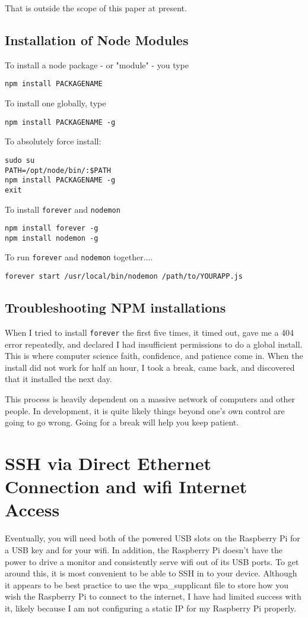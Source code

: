That is outside the scope of this paper at present. 

\subsection{Installation of Node Modules}
To install a node package - or "module" - you type 

\begin{lstlisting}
npm install PACKAGENAME
\end{lstlisting}

To install one globally, type
\begin{lstlisting}
npm install PACKAGENAME -g
\end{lstlisting}


To absolutely force install:
\begin{lstlisting}
sudo su
PATH=/opt/node/bin/:$PATH
npm install PACKAGENAME -g
exit
\end{lstlisting}

To install \texttt{forever} and \texttt{nodemon}
\begin{lstlisting}
npm install forever -g
npm install nodemon -g
\end{lstlisting}

To run \texttt{forever} and \texttt{nodemon} together....
\begin{lstlisting}
forever start /usr/local/bin/nodemon /path/to/YOURAPP.js
\end{lstlisting}

\subsection{Troubleshooting NPM installations}
When I tried to install \texttt{forever} the first five times, it timed out, gave me a 404 error repeatedly, and declared I had insufficient permissions to do a global install. This is where computer science faith, confidence, and patience come in. When the install did not work for half an hour, I took a break, came back, and discovered that it installed the next day.

This process is heavily dependent on a massive network of computers and other people. In development, it is quite likely things beyond one's own control are going to go wrong. Going for a break will help you keep patient.

\section{SSH via Direct Ethernet Connection and wifi Internet Access}
Eventually, you will need both of the powered USB slots on the Raspberry Pi for a USB key and for your wifi. In addition, the Raspberry Pi doesn't have the power to drive a monitor and consistently serve wifi out of its USB ports. To get around this, it is most convenient to be able to SSH in to your device. Although it appears to be best practice to use the wpa_supplicant file to store how you wish the Raspberry Pi to connect to the internet, I have had limited success with it, likely because I am not configuring a static IP for my Raspberry Pi properly.

